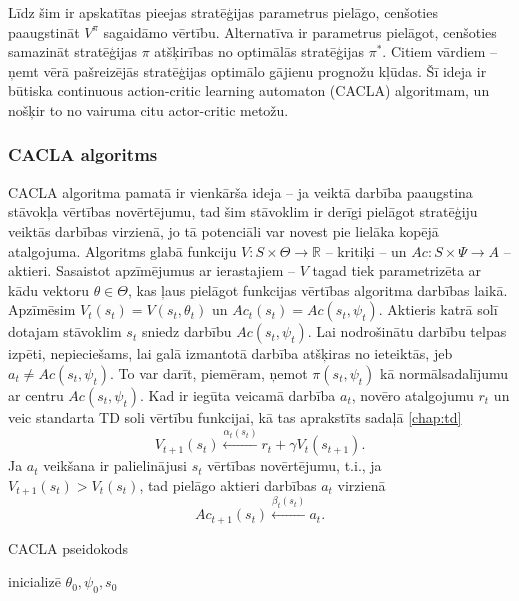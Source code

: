\documentclass{ludis} %
\begin{document}
Līdz šim ir apskatītas pieejas stratēģijas parametrus pielāgo, cenšoties paaugstināt $V^\pi$ sagaidāmo vērtību.
Alternatīva ir parametrus pielāgot, cenšoties samazināt stratēģijas $\pi$ atšķirības no optimālās stratēģijas $\pi^*$.
Citiem vārdiem -- ņemt vērā pašreizējās stratēģijas optimālo gājienu prognožu kļūdas.
Šī ideja ir būtiska continuous action-critic learning automaton (CACLA) algoritmam, un nošķir to no vairuma citu actor-critic metožu.

\subsubsection{CACLA algoritms}
CACLA algoritma pamatā ir vienkārša ideja -- ja veiktā darbība paaugstina stāvokļa vērtības novērtējumu, tad šim stāvoklim ir derīgi pielāgot stratēģiju veiktās darbības virzienā, jo tā potenciāli var novest pie lielāka kopējā atalgojuma.
Algoritms glabā funkciju $V:S \times \Theta \rightarrow \mathbb{R}$ -- kritiķi -- un $Ac : S \times \Psi \rightarrow A$ -- aktieri. Sasaistot apzīmējumus ar ierastajiem -- $V$ tagad tiek parametrizēta ar kādu vektoru $\theta \in \Theta$, kas ļaus pielāgot funkcijas vērtības algoritma darbības laikā. Apzīmēsim $V_t(s_t) = V(s_t, \theta_t)$ un $Ac_t(s_t) = Ac(s_t, \psi_t)$.
Aktieris katrā solī dotajam stāvoklim $s_t$ sniedz darbību $Ac(s_t, \psi_t)$.
Lai nodrošinātu darbību telpas izpēti, nepieciešams, lai galā izmantotā darbība atšķiras no ieteiktās, jeb $a_t \neq Ac(s_t, \psi_t)$.
To var darīt, piemēram, ņemot $\pi(s_t, \psi_t)$ kā normālsadalījumu ar centru $Ac(s_t, \psi_t)$.
Kad ir iegūta veicamā darbība $a_t$, novēro atalgojumu $r_t$ un veic standarta TD soli vērtību funkcijai, kā tas aprakstīts sadaļā \ref{chap:td}
\[
	V_{t+1}(s_t) \xleftarrow{\alpha_t(s_t)} r_t + \gamma V_t(s_{t + 1}).
\]
Ja $a_t$ veikšana ir palielinājusi $s_t$ vērtības novērtējumu, t.i., ja $V_{t+1}(s_t) > V_t(s_t)$, tad pielāgo aktieri darbības $a_t$ virzienā
\[
	Ac_{t+1}(s_t) \xleftarrow{\beta_t(s_t)} a_t.
\]


\begin{spacing}{1}
\begin{algorithm}
\caption{CACLA pseidokods}\label{alg:cacla}
inicializē $\theta_0, \psi_0, s_0$ \\
\end{algorithm}
\end{spacing}
\end{document}
